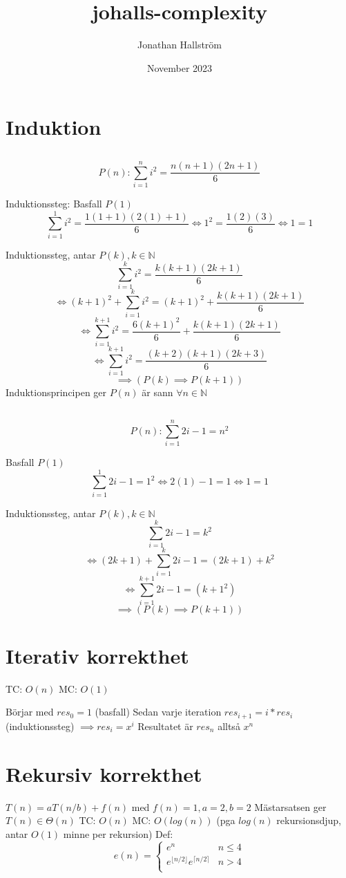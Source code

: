 \documentclass{article}
\title{johalls-complexity}
\author{Jonathan Hallström}
\date{November 2023}
\begin{document}
\maketitle


\section{Induktion}
\subsection{}

$$P(n):  \sum _{i=1}^n i^2=\frac{n(n+1)(2n+1)}{6}$$

Induktionssteg:
Basfall $P(1)$
$$\sum _{i=1}^1 i^2=\frac{1(1+1)(2(1)+1)}{6} \iff 1^2=\frac{1(2)(3)}{6} \iff 1=1$$

Induktionssteg, antar $P(k), k \in \mathbb{N}$
$$\sum _{i=1}^k i^2=\frac{k(k+1)(2k+1)}{6}$$
$$ \iff (k+1)^2 + \sum _{i=1}^k i^2=(k+1)^2+\frac{k(k+1)(2k+1)}{6}$$
$$\iff \sum _{i=1}^{k+1} i^2=\frac{6(k+1)^2}{6}+\frac{k(k+1)(2k+1)}{6}$$
$$\iff \sum _{i=1}^{k+1} i^2=\frac{(k+2)(k+1)(2k+3)}{6}$$
$$\implies (P(k) \implies P(k+1))$$
Induktionsprincipen ger $P(n)$ är sann $\forall n \in \mathbb{N}$

\subsection{}
$$P(n):  \sum _{i=1}^n 2i-1=n^2$$

Basfall $P(1)$
$$\sum _{i=1}^1 2i-1=1^2\iff 2(1)-1=1\iff1=1$$

Induktionssteg, antar $P(k),k \in \mathbb{N}$
$$\sum _{i=1}^k 2i-1=k^2$$
$$\iff (2k+1)+\sum _{i=1}^k 2i-1=(2k+1)+k^2$$
$$\iff \sum _{i=1}^{k+1} 2i-1=(k+1^2)$$
$$\implies (P(k) \implies P(k+1))$$

\section{Iterativ korrekthet}
TC: $O(n)$
MC: $O(1)$

Börjar med $res_0=1$ (basfall)
Sedan varje iteration $res_{i+1}=i*res_i$ (induktionssteg)
$\implies res_i=x^i$
Resultatet är $res_n$ alltså $x^n$

\section{Rekursiv korrekthet}
$T(n) = aT(n/b)+f(n)$ med $f(n)=1,a=2,b=2$
Mästarsatsen ger $T(n) \in\mathbb{\Theta}(n)$
TC: $O(n)$ 
MC: $O(log(n))$ (pga $log(n)$ rekursionsdjup, antar $O(1)$ minne per rekursion)
Def: $$e(n) = \begin{cases}
e^n & n \leq 4 \\
e^{\lfloor n/2 \rfloor}e^{\lceil n/2 \rceil} & n > 4\\
\end{cases}
$$
\end{document}
